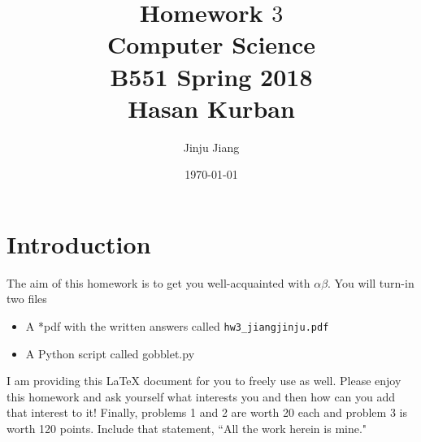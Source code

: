 \documentclass{article}
\begin{document}
\title{Homework $3$\\ Computer Science \\ B551 Spring 2018\\ Hasan Kurban}         %
\author{Jinju Jiang}        %
\date{\today}          %
\maketitle

      
\makeatother     %




\pagestyle{plain}
\section*{Introduction}
The aim of this homework is to get you well-acquainted with $\alpha\beta$. You will turn-in two files \begin{itemize} \item A *pdf with the written answers called \texttt{hw3\_jiangjinju.pdf} \item  A Python script called gobblet.py\end{itemize}  I am providing this \LaTeX{} document for you to freely use as well. Please enjoy this homework and ask yourself what interests you and then how can you add that interest to it!  Finally, problems 1 and 2 are worth 20 each and problem 3 is worth 120 points. Include that
statement, ``All the work herein is mine."

\newpage
\end{document}

